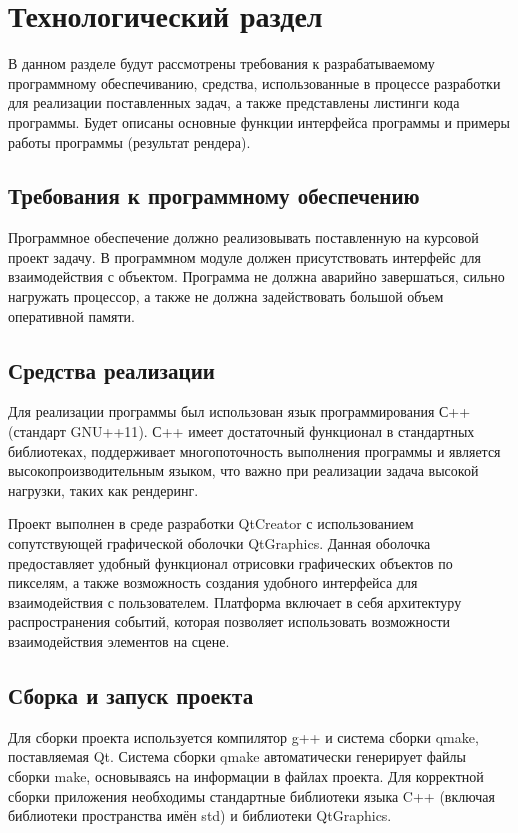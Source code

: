 \chapter{Технологический раздел}
\vspace{-0.5cm}	\hspace{0.6cm}В данном разделе будут рассмотрены требования к разрабатываемому программному обеспечиванию, средства, использованные в процессе разработки для реализации поставленных задач, а также представлены листинги кода программы. Будет описаны основные функции интерфейса программы и примеры работы программы (результат рендера).

\section{Требования к программному обеспечению}
\hspace{0.6cm}Программное обеспечение должно реализовывать поставленную на курсовой проект задачу. В программном модуле должен присутствовать интерфейс для взаимодействия с объектом. Программа не должна аварийно завершаться, сильно нагружать процессор, а также не должна задействовать большой объем оперативной памяти.

\section{Средства реализации}
\hspace{0.6cm}Для реализации программы был использован язык программирования С++ (стандарт GNU++11\cite{web:cpp}). С++ имеет достаточный функционал в стандартных библиотеках, поддерживает многопоточность выполнения программы и является высокопроизводительным языком, что важно при реализации задача высокой нагрузки, таких как рендеринг.

\vspace{0.2cm}Проект выполнен в среде разработки QtCreator с использованием сопутствующей графической оболочки QtGraphics\cite{web:qt}. Данная оболочка предоставляет удобный функционал отрисовки графических объектов по пикселям, а также возможность создания удобного интерфейса для взаимодействия с пользователем. Платформа включает в себя архитектуру распространения событий, которая позволяет использовать возможности взаимодействия элементов на сцене.

\section{Сборка и запуск проекта}
\hspace{0.6cm}Для сборки проекта используется компилятор g++ и система сборки qmake, поставляемая Qt\cite{web:qt}. Система сборки qmake автоматически генерирует файлы сборки make, основываясь на информации в файлах проекта. Для корректной сборки приложения необходимы стандартные библиотеки языка C++ (включая библиотеки пространства имён std) и библиотеки QtGraphics.

